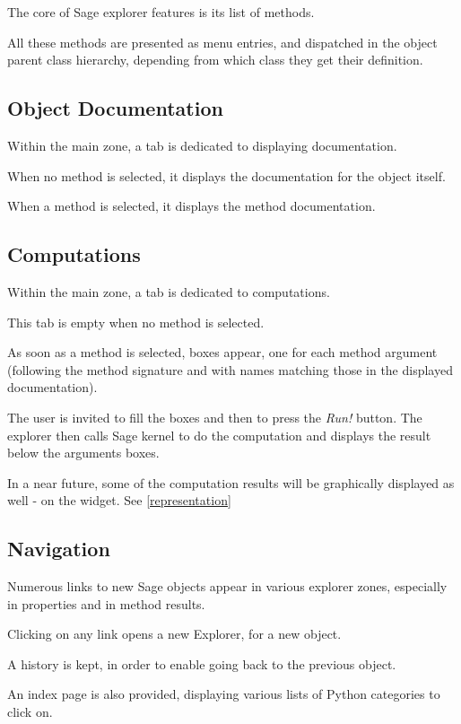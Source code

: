 \documentclass{deliverablereport}
\begin{document}
The core of Sage explorer features is its list of methods.

All these methods are presented as menu entries, and dispatched in the
object parent class hierarchy, depending from
which class they get their definition.

\subsection{Object Documentation}

Within the main zone, a tab is dedicated to displaying documentation.

When no method is selected, it displays the documentation for the object itself.

When a method is selected, it displays the method documentation.

\subsection{Computations}

Within the main zone, a tab is dedicated to computations.

This tab is empty when no method is selected.

As soon as a method is selected, boxes appear, one for each method
argument (following the method signature and with names matching those
in the displayed documentation).

The user is invited to fill the boxes and then to press the
\emph{Run!} button. The explorer then calls Sage kernel to do the
computation and displays the result below the arguments boxes.

In a near future, some of the computation results will be graphically
displayed as well - on the widget. See \ref{representation}


\subsection{Navigation}

Numerous links to new Sage objects appear in various explorer zones,
especially in properties and in method results.

Clicking on any link opens a new Explorer, for a new object.

A history is kept, in order to enable going back to the previous object.

An index page is also provided, displaying various lists of Python
categories to click on.
\end{document}
